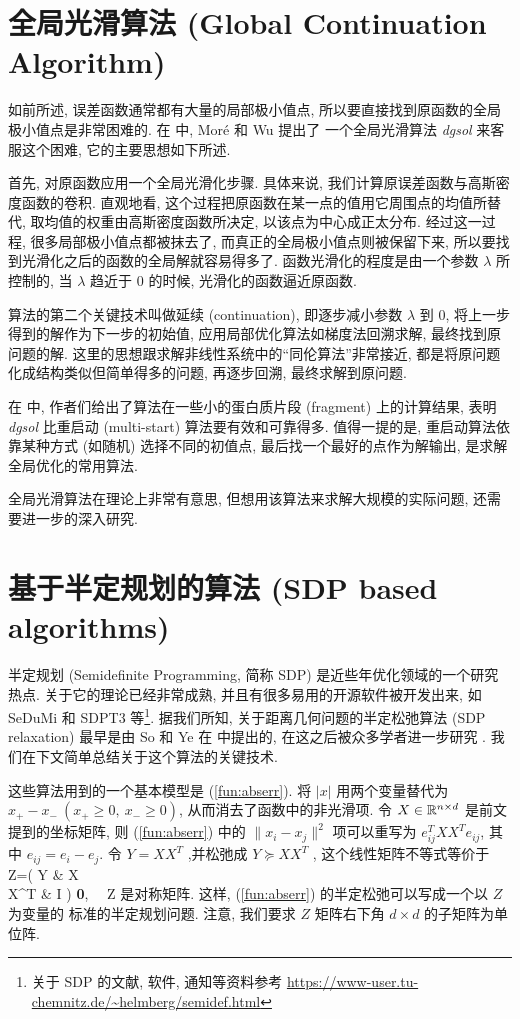 \documentclass{CASthesis_zzk}
\begin{document}
\section{全局光滑算法 (Global Continuation Algorithm)}
\label{sec:Continuation}
如前所述, 误差函数通常都有大量的局部极小值点,
所以要直接找到原函数的全局极小值点是非常困难的.
在 \cite{More1997,More1999} 中, Mor\'e 和 Wu 提出了
一个全局光滑算法 \emph{dgsol} 来客服这个困难,
它的主要思想如下所述.

首先, 对原函数应用一个全局光滑化步骤. 
具体来说, 我们计算原误差函数与高斯密度函数的卷积.
直观地看, 这个过程把原函数在某一点的值用它周围点的均值所替代,
取均值的权重由高斯密度函数所决定, 以该点为中心成正太分布.
经过这一过程, 很多局部极小值点都被抹去了, 而真正的全局极小值点则被保留下来,
所以要找到光滑化之后的函数的全局解就容易得多了.
函数光滑化的程度是由一个参数 $\lambda$ 所控制的,
当 $\lambda$ 趋近于 0 的时候, 光滑化的函数逼近原函数.

算法的第二个关键技术叫做延续 (continuation), 
即逐步减小参数 $\lambda$ 到 0, 将上一步得到的解作为下一步的初始值,
应用局部优化算法如梯度法回溯求解, 最终找到原问题的解.
这里的思想跟求解非线性系统中的``同伦算法''非常接近,
都是将原问题化成结构类似但简单得多的问题, 再逐步回溯, 最终求解到原问题.

在 \cite{More1999} 中, 作者们给出了算法在一些小的蛋白质片段 (fragment)
上的计算结果, 表明 \emph{dgsol} 比重启动 (multi-start) 算法要有效和可靠得多.
值得一提的是, 重启动算法依靠某种方式 (如随机) 选择不同的初值点,
最后找一个最好的点作为解输出, 是求解全局优化的常用算法. 

全局光滑算法在理论上非常有意思, 但想用该算法来求解大规模的实际问题,
还需要进一步的深入研究.


\section{基于半定规划的算法 (SDP based algorithms)}
\label{sec:SDPalg}
半定规划 (Semidefinite Programming, 简称 SDP) 是近些年优化领域的一个研究热点.
关于它的理论已经非常成熟, 并且有很多易用的开源软件被开发出来,
如 SeDuMi 和 SDPT3 等\footnote{关于 SDP 的文献, 软件, 通知等资料参考
\url{https://www-user.tu-chemnitz.de/~helmberg/semidef.html}}. 
据我们所知, 关于距离几何问题的半定松弛算法 (SDP relaxation) 
最早是由 So 和 Ye 在 \cite{So2006} 中提出的, 
在这之后被众多学者进一步研究 \cite{Biswas2006-1,Biswas2006-2,Biswas2008,Shamsi2010,Fang2013}. 
我们在下文简单总结关于这个算法的关键技术.

这些算法用到的一个基本模型是 (\ref{fun:abserr}). 
将 $|x|$ 用两个变量替代为 $x_+-x_- ~(x_+\geq 0,~x_-\geq 0)$, 
从而消去了函数中的非光滑项.
令 $X\in \mathbb{R}^{n\times d}$ 是前文提到的坐标矩阵,
则 (\ref{fun:abserr}) 中的 $\|x_i-x_j\|^2$ 项可以重写为 $e_{ij}^TXX^Te_{ij}$, 
其中 $e_{ij}=e_i-e_j$. 
令 $Y=XX^T$ ,并松弛成 $Y\succeq XX^T$ \cite{Boyd1994}, 
这个线性矩阵不等式等价于
\be Z=\left( Y & X \\ X^T & I \ea \right) \succeq \textbf{0}, ~~Z \textrm{ 是对称矩阵}.\ee
这样, (\ref{fun:abserr}) 的半定松弛可以写成一个以 $Z$ 为变量的
标准的半定规划问题. 注意, 我们要求 $Z$ 矩阵右下角 $d \times d$ 的子矩阵为单位阵.
\end{document}
